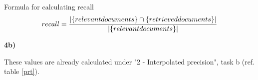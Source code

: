 \documentclass[a4paper, norsk, 11pt]{scrartcl} %
\numberwithin{equation}{section} %
\numberwithin{figure}{section} %
\numberwithin{table}{section} %
\begin{document}
Formula for calculating recall
\begin{equation*}
recall= { {|\{ relevant documents \} \cap \{retrieved documents \} |} \over {| \{ relevant documents \} |}}
\end{equation*}


\vspace{22pt}


\textbf{4b)}

These values are already calculated under "2 - Interpolated precision", task b (ref. table \ref{prt}).


\end{document}
